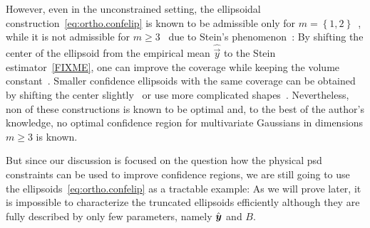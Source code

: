 However, even in the unconstrained setting, the ellipsoidal construction~\eqref{eq:ortho.confelip} is known to be admissible only for $m=\left\{ 1,2\right\}$~\cite{Joshi_1969_Admissibility}, while it is not admissible for $m\geq3$~\cite{Joshi_1967_Inadmissibility} due to Stein's phenomenon~\cite{Stein_1956_Inadmissibility}:
By shifting the center of the ellipsoid from the empirical mean $\hat{\vec y}$ to the Stein estimator~\eqref{FIXME}, one can improve the coverage while keeping the volume constant~\cite{Joshi_1967_Inadmissibility}.
Smaller confidence ellipsoids with the same coverage can be obtained by shifting the center slightly~\cite{Tseng_1997_Good,Hwang_1982_Minimax} or use more complicated shapes~\cite{Shinozaki_????_Improved,Brown_1995_Optimal}.
Nevertheless, non of these constructions is known to be optimal and, to the best of the author's knowledge, no optimal confidence region for multivariate Gaussians in dimensions $m \ge 3$ is known.

But since our discussion is focused on the question how the physical psd constraints can be used to improve confidence regions, we are still going to use the ellipsoids~\eqref{eq:ortho.confelip} as a tractable example:
As we will prove later, it is impossible to characterize the truncated ellipsoids efficiently although they are fully described by only few parameters, namely $\hat{\boldsymbol{y}}$ and $B$.\\



